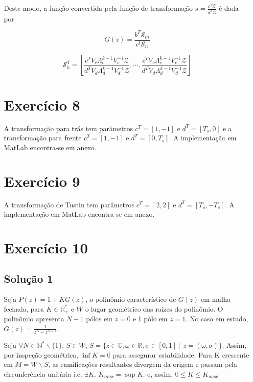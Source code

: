 \documentclass[twoside, fleqn]{article}
\begin{document}
    Deste modo, a função convertida pela função de transformação $s = \frac{c^T \mathcal{Z}}{d^T \mathcal{Z}}$ é dada por
    
    \begin{equation}
        G(z) = \frac{b^T \mathcal{S}_m}{c^t \mathcal{S}_n}    
    \end{equation}
    
    \begin{equation}
        \mathcal{S}_k^T = \left[\frac{c^T V_c \Lambda_c^{k-1} V_c^{-1} \mathcal{Z}}{d^T V_d \Lambda_d^{k-1} V_d^{-1} \mathcal{Z}}, \cdots, \frac{c^T V_c \Lambda_c^{k-1} V_c^{-1} \mathcal{Z}}{d^T V_d \Lambda_d^{k-1} V_d^{-1} \mathcal{Z}}\right]
    \end{equation}

\section*{Exercício 8}

    A transformação para trás tem parâmetros $c^T = [1, -1]$ e $d^T = [T_s, 0]$ e a transformação para frente $c^T = [1, -1]$ e $d^T = [0, T_s]$. A implementação em MatLab encontra-se em anexo.

\section*{Exercício 9}
\label{ex:ex9}

    A transformação de Tustin tem parâmetros $c^T = [2, 2]$ e $d^T = [T_s, -T_s]$. A implementação em MatLab encontra-se em anexo.

\section*{Exercício 10}

\subsection*{Solução 1}

    Seja $P(z) = 1 + K G(z)$, o polinômio característico de $G(z)$ em malha fechada, para $K \in \mathbb{R}^*_{+}$ e $W$ o lugar geométrico das raízes do polinômio. O polinômio apresenta $N-1$ pólos em $z = 0$ e 1 pólo em $z = 1$. No caso em estudo, $G(z) = \frac{1}{z^{N} - z^{N-1}}$.
    
    Seja $\forall N \in \mathbb{N}^*\backslash{\{1\}}$, $S \in W$, $S = \{z \in \mathbb{C}, \omega \in \mathbb{R}, \sigma \in [0, 1] \,\, | \,\, z = (\omega, \sigma)\}$. Assim, por inspeção geométrica, $\inf K = 0$ para assegurar estabilidade. Para K crescente em $M = W \backslash {S}$, as ramificações resultantes divergem da origem e passam pela circunferência unitária i.e. $\exists K$, $K_{max} = \sup K$. e, assim, $0 \leq K \leq K_{max}$
    
\end{document}
